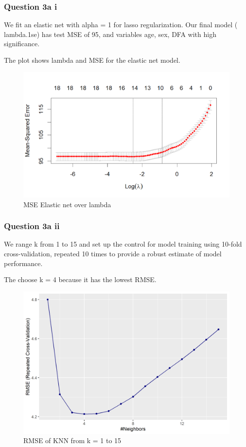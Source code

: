 \documentclass[
]{article}
\begin{document}
\hypertarget{question-3a-i}{%
\subsubsection{Question 3a i}\label{question-3a-i}}

We fit an elastic net with alpha = 1 for lasso regularization. Our final
model ( lambda.1se) has test MSE of 95, and variables age, sex, DFA with
high significance.

The plot shows lambda and MSE for the elastic net model.

\begin{figure}
\centering
\includegraphics[width=4.85417in,height=\textheight]{mse_elastic_net.png}
\caption{MSE Elastic net over lambda}
\end{figure}

\hypertarget{question-3a-ii}{%
\subsubsection{Question 3a ii}\label{question-3a-ii}}

We range k from 1 to 15 and set up the control for model training using
10-fold cross-validation, repeated 10 times to provide a robust estimate
of model performance.

The choose k = 4 because it has the lowest RMSE.

\begin{figure}
\centering
\includegraphics[width=4.875in,height=\textheight]{rmse_knn.png}
\caption{RMSE of KNN from k = 1 to 15}
\end{figure}
\end{document}
